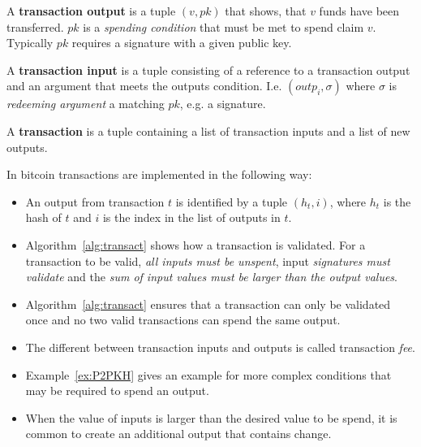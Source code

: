 \begin{definition}
	A \textbf{transaction output} is a tuple $(v, pk)$ that shows, that $v$ funds have been transferred. $pk$ is a \emph{spending condition} that must be met to spend claim $v$. Typically $pk$ requires a signature with a given public key.
	
	A \textbf{transaction input} is a tuple consisting of a reference to a transaction output and an argument that meets the outputs condition.
	I.e. $(outp_i,\sigma)$ where $\sigma$ is \emph{redeeming argument} a matching $pk$, e.g. a signature.
	
	A \textbf{transaction} is a tuple containing a list of transaction inputs and a list of new outputs.
\end{definition}


\begin{note}
	\label{bitcoin:transactions}
	In bitcoin transactions are implemented in the following way:
	\begin{itemize}
		\item An output from transaction $t$ is identified by a tuple $(h_t,i)$,
		where $h_t$ is the hash of $t$ and $i$ is the index in the list of outputs in $t$.
		\item Algorithm~\ref{alg:transact} shows how a transaction is validated.
		For a transaction to be valid, \emph{all inputs must be unspent}, input \emph{signatures must validate} and the \emph{sum of input values must be larger than the  output values}.
		\item Algorithm~\ref{alg:transact} ensures that a transaction can only be validated once and no two valid transactions can spend the same output.
		\item The different between transaction inputs and outputs is called transaction \emph{fee}.
		\item Example~\ref{ex:P2PKH} gives an example for more complex conditions that may be required to spend an output.
		\item When the value of inputs is larger than the desired value to be spend, it is common to create an additional output that contains change.
	\end{itemize}
	
\end{note}

